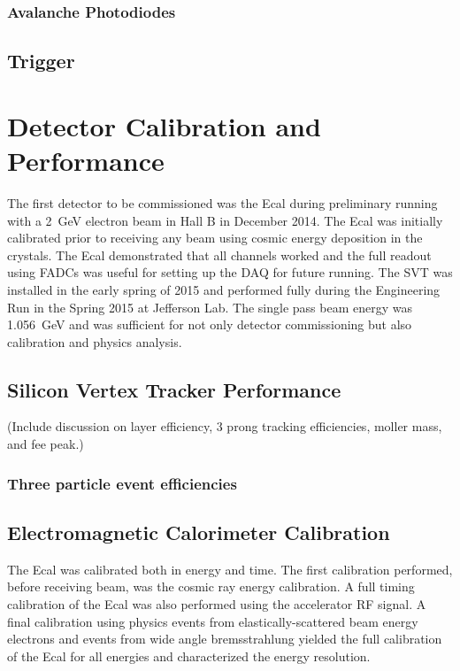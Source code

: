 \documentclass[12pt]{report}
\begin{document}
\subsection{Avalanche Photodiodes}



\section{Trigger}



\chapter{Detector Calibration and Performance} 

The first detector to be commissioned was the Ecal during preliminary running with a 2~GeV electron beam in Hall B in December 2014. The Ecal was initially calibrated prior to receiving any beam using cosmic energy deposition in the crystals. The Ecal demonstrated that all channels worked and the full readout using FADCs was useful for setting up the DAQ for future running. The SVT was installed in the early spring of 2015 and performed fully during the Engineering Run in the Spring 2015 at Jefferson Lab. The single pass beam energy was 1.056~GeV and was sufficient for not only detector commissioning but also calibration and physics analysis. 

\section{Silicon Vertex Tracker Performance}

(Include discussion on layer efficiency, 3 prong tracking efficiencies, moller mass, and fee peak.)

\subsection{Three particle event efficiencies}

\section{Electromagnetic Calorimeter Calibration}

The Ecal was calibrated both in energy and time. The first calibration performed, before receiving beam, was the cosmic ray energy calibration. A full timing calibration of the Ecal was also performed using the accelerator RF signal. A final calibration using physics events from elastically-scattered beam energy electrons and events from wide angle bremsstrahlung yielded the full calibration of the Ecal for all energies and characterized the energy resolution. 
\end{document}
